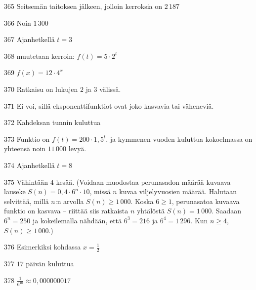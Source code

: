 \begin{Vastaus}{365}
Seitsemän taitoksen jälkeen, jolloin kerroksia on $2\,187$
\end{Vastaus}
\begin{Vastaus}{366}
Noin $1\,300$
\end{Vastaus}
\begin{Vastaus}{367}
Ajanhetkellä $t=3$ %
\end{Vastaus}
\begin{Vastaus}{368}
muutetaan kerroin: $f(t) = 5 \cdot 2^t$
\end{Vastaus}
\begin{Vastaus}{369}
$f(x)=12\cdot 4^{x}$
\end{Vastaus}
\begin{Vastaus}{370}
Ratkaisu on lukujen $2$ ja $3$ välissä.
\end{Vastaus}
\begin{Vastaus}{371}
Ei voi, sillä eksponenttifunktiot ovat joko kasvavia tai väheneviä.
\end{Vastaus}
\begin{Vastaus}{372}
Kahdeksan tunnin kuluttua
\end{Vastaus}
\begin{Vastaus}{373}
Funktio on $f(t) = 200 \cdot 1,5^t$, ja kymmenen vuoden kuluttua kokoelmassa on yhteensä noin $11\,000$ levyä.
\end{Vastaus}
\begin{Vastaus}{374}
Ajanhetkellä $t = 8$
\end{Vastaus}
\begin{Vastaus}{375}
	Vähintään $4$ kesää. (Voidaan muodostaa perunasadon määrää kuvaava lauseke $S(n)=0,4\cdot6^n\cdot10$, missä $n$ kuvaa viljelyvuosien määrää. Halutaan selvittää, millä $n$:n arvolla $S(n)\geq1\,000$. Koska $6\geq1$, perunasatoa kuvaava funktio on kasvava -- riittää siis ratkaista $n$ yhtälöstä $S(n)=1\,000$. Saadaan $6^n=250$ ja kokeilemalla nähdään, että $6^3=216$ ja $6^4=1\,296$. Kun $n\geq4$, $S(n)\geq1\,000$.)
	
\end{Vastaus}
\begin{Vastaus}{376}
Esimerkiksi kohdassa $x = \frac{1}{2}$
	
\end{Vastaus}
\begin{Vastaus}{377}
$17$ päivän kuluttua
\end{Vastaus}
\begin{Vastaus}{378}
$ \frac{1}{6^{10}}\approx0,000000017$
\end{Vastaus}
